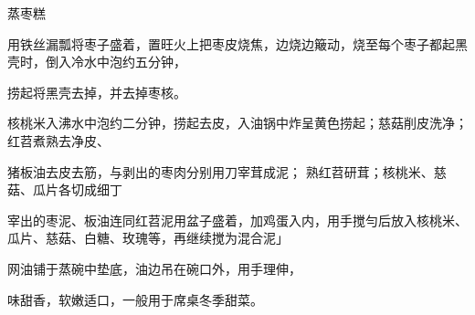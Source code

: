 \begin{recipe}{蒸枣糕}

\ingredients


\cooking

\step 用铁丝漏瓢将枣子盛着，置旺火上把枣皮烧焦，边烧边簸动，烧至每个枣子都起黑壳时，倒入冷水中泡约五分钟，

捞起将黑壳去掉，并去掉枣核。

\step 核桃米入沸水中泡约二分钟，捞起去皮，入油锅中炸呈黄色捞起；慈菇削皮洗净；红苕煮熟去净皮、

猪板油去皮去筋，与剥出的枣肉分别用刀宰茸成泥； 熟红苕研茸；核桃米、慈菇、瓜片各切成细丁

\step 宰出的枣泥、板油连同红苕泥用盆子盛着，加鸡蛋入内，用手搅勻后放入核桃米、瓜片、慈菇、白糖、玫瑰等，再继续搅为混合泥」

\step 网油铺于蒸碗中垫底，油边吊在碗口外，用手理伸，

\notes

味甜香，软嫩适口，一般用于席桌冬季甜菜。

\end{recipe}

